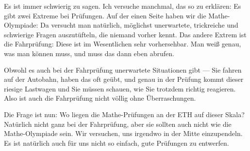 \begin{spoken-clean}[01:24:19 - 01:26:29]
Es ist immer schwierig zu sagen. Ich versuche manchmal, das so zu erklären: Es gibt zwei Extreme bei Prüfungen. Auf der einen Seite haben wir die Mathe-Olympiade: Da versucht man natürlich, möglichst unerwartete, trickreiche und schwierige Fragen auszutüfteln, die niemand vorher kennt. Das andere Extrem ist die Fahrprüfung: Diese ist im Wesentlichen sehr vorhersehbar. Man weiß genau, was man können muss, und muss das dann eben abrufen.

Obwohl es auch bei der Fahrprüfung unerwartete Situationen gibt --- Sie fahren auf der Autobahn, haben das oft geübt, und genau in der Prüfung kommt dieser riesige Lastwagen und Sie müssen schauen, wie Sie trotzdem richtig reagieren. Also ist auch die Fahrprüfung nicht völlig ohne Überraschungen.

Die Frage ist nun: Wo liegen die Mathe-Prüfungen an der ETH auf dieser Skala? Natürlich nicht ganz bei der Fahrprüfung, aber sie sollten auch nicht wie die Mathe-Olympiade sein. Wir versuchen, uns irgendwo in der Mitte einzupendeln. Es ist natürlich auch für uns nicht so einfach, gute Prüfungen zu entwerfen.
\end{spoken-clean}

\begin{math-stroke}
\begin{center}
\end{center}
\end{math-stroke}

